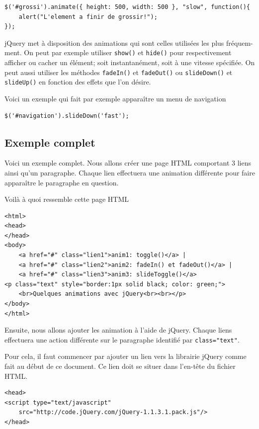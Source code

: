 \documentclass[10pt,a4paper,titlepage]{article}
\begin{document}
\begin{lstlisting}
$('#grossi').animate({ height: 500, width: 500 }, "slow", function(){
    alert("L'element a finir de grossir!");
});
\end{lstlisting}

jQuery met à disposition des animations qui sont celles utilisées les plus fréquem-ment. On peut par exemple utiliser \texttt{show()} et \texttt{hide()} pour respectivement afficher ou cacher un élément; soit instantanément, soit à une vitesse spécifiée. On peut aussi utiliser les méthodes \texttt{fadeIn()} et \texttt{fadeOut()} ou \texttt{slideDown()} et \texttt{slideUp()} en fonction des effets que l'on désire. 


Voici un exemple qui fait par exemple apparaître un menu de navigation

\begin{lstlisting}
$('#navigation').slideDown('fast');
\end{lstlisting}

\subsection{Exemple complet}

Voici un exemple complet. Nous allons créer une page HTML comportant 3 liens ainsi qu'un paragraphe. Chaque lien effectuera une animation différente pour faire apparaître le paragraphe en question.

Voilà à quoi ressemble cette page HTML

\begin{lstlisting}
<html>
<head>
</head>
<body>
	<a href="#" class="lien1">anim1: toggle()</a> | 
	<a href="#" class="lien2">anim2: fadeIn() et fadeOut()</a> | 
	<a href="#" class="lien3">anim3: slideToggle()</a>
<p class="text" style="border:1px solid black; color: green;">
	<br>Quelques animations avec jQuery<br><br></p>
</body>
</html>
\end{lstlisting}

Ensuite, nous allons ajouter les animation à l'aide de jQuery. Chaque liens effectuera une action différente sur le paragraphe identifié par \texttt{class="text"}.

Pour cela, il faut commencer par ajouter un lien vers la librairie jQuery comme fait au début de ce document. Ce lien doit se situer dans l'en-tête du fichier HTML.

\begin{lstlisting}
<head>
<script type="text/javascript" 
	src="http://code.jQuery.com/jQuery-1.1.3.1.pack.js"/>
</head>
\end{lstlisting}
\end{document}
